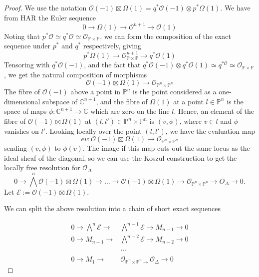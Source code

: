 \begin{proof}
    We use the notation $\mathcal{O}(-1)\boxtimes \Omega (1) = q^{*}\mathcal{O}(-1)\otimes p^{*}\Omega (1)$. We have from HAR the Euler sequence $$0 \to \Omega(1)\to \mathcal{O}^{n+1}\to \mathcal{O}(1)$$
    Noting that $p^{*}\mathcal{O} \simeq q^{*}\mathcal{O} \simeq \mathcal{O}_{\mathbb{P}\times \mathbb{P}}$, we can form the composition of the exact sequence under $p^*$ and $q^*$ respectively, giving $$p^{*}\Omega (1)\to \mathcal{O}_{\mathbb{P}\times \mathbb{P}}^{n+1} \to q^{*}\mathcal{O}(1)$$
    Tensoring with $q^{*}\mathcal{O}(-1)$, and the fact that $q^{*}\mathcal{O}(-1) \otimes q^{*}\mathcal{O}(1) \simeq q^{*\mathcal{O}}\simeq \mathcal{O}_{\mathbb{P}\times \mathbb{P}}$, we get the natural composition of morphisms $$\mathcal{O}(-1)\boxtimes \Omega(1) \to \mathcal{O}_{\mathbb{P}^{n}\times \mathbb{P}^n}$$
    The fibre of $\mathcal{O}(-1)$ above a point in $\mathbb{P}^n$ is the point considered as a one-dimensional subspace of $\mathbb{C}^{n+1}$, and the fibre of $\Omega (1)$ at a point $l \in \mathbb{P}^n$ is the space of maps $\phi : \mathbb{C}^{n+1}\to \mathbb{C}$ which are zero on the line $l$. Hence, an element of the fibre of  $\mathcal{O}(-1)\boxtimes \Omega (1)$ at $(l,l') \in \mathbb{P}^{n}\times \mathbb{P}^n$ is $(v,\phi)$, where $v \in l$ and $\phi$ vanishes on $l'$. Looking locally over the point $(l,l')$, we have the evaluation map $$ev: \mathcal{O}(-1)\boxtimes \Omega (1) \to \mathcal{O}_{\mathbb{P}^{n}\times \mathbb{P}^{n}}$$ 
    sending $(v,\phi)$ to $\phi(v)$. The image if this map cuts out the same locus as the ideal sheaf of the diagonal, so we can use the Koszul construction to get the locally free resolution for $\mathcal{O}_\Delta$$$
    0 \to \bigwedge^{n}\mathcal{O}(-1)\boxtimes\Omega(1) \to \dots\to \mathcal{O}(-1)\boxtimes\Omega(1)\to \mathcal{O}_{\mathbb{P}^{n}\times \mathbb{P}^{n}} \to O_{\Delta}\to 0.
    $$
    Let $\mathcal{E} :=\mathcal{O}(-1)\boxtimes\Omega(1)$. 
    
    We can split the above resolution into a chain of short exact sequences
    
    \begin{align*}
    0 \to \bigwedge^{n}\mathcal{E} \to &\bigwedge^{n-1}\mathcal{E}\to M_{n-1}\to 0  \\
    0\to M_{n-1}\to & \bigwedge^{n-2}\mathcal{E}\to M_{n-2}\to 0  \\  \\
    &\dots \\  \\
    0\to M_{1}\to &\mathcal{O}_{\mathbb{P}^{n}\times \mathbb{P}^{n}\to}\mathcal{O}_{\Delta}\to 0
    \end{align*}
    

\end{proof}
